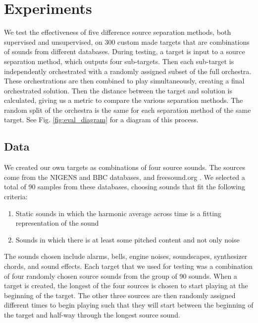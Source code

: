 \documentclass{article}
\begin{document}
	
	\section{Experiments}\label{sec:experiments}
	
	We test the effectiveness of five difference source separation methods, both supervised and unsupervised, on 300 custom made targets that are combinations of sounds from different databases. During testing, a target is input to a source separation method, which outputs four sub-targets. Then each sub-target is independently orchestrated with a randomly assigned subset of the full orchestra. These orchestrations are then combined to play simultaneously, creating a final orchestrated solution. Then the distance between the target and solution is calculated, giving us a metric to compare the various separation methods. The random split of the orchestra is the same for each separation method of the same target. See Fig. \ref{fig:eval_diagram} for a diagram of this process.
	
		\subsection{Data}\label{subsec:data}
		We created our own targets as combinations of four source sounds. The sources come from the NIGENS \cite{NIGENS} and BBC \cite{BBC} databases, and freesound.org \cite{freesound}. We selected a total of 90 samples from these databases, choosing sounds that fit the following criteria: 
		
		\begin{enumerate}
			\item Static sounds in which the harmonic average across time is a fitting representation of the sound
			\item Sounds in which there is at least some pitched content and not only noise
		\end{enumerate}			
		The sounds chosen include alarms, bells, engine noises, soundscapes, synthesizer chords, and sound effects. Each target that we used for testing was a combination of four randomly chosen source sounds from the group of 90 sounds. 
		When a target is created, the longest of the four sources is chosen to start playing at the beginning of the target. The other three sources are then randomly assigned different times to begin playing such that they will start between the beginning of the target and half-way through the longest source sound.
		
\end{document}
